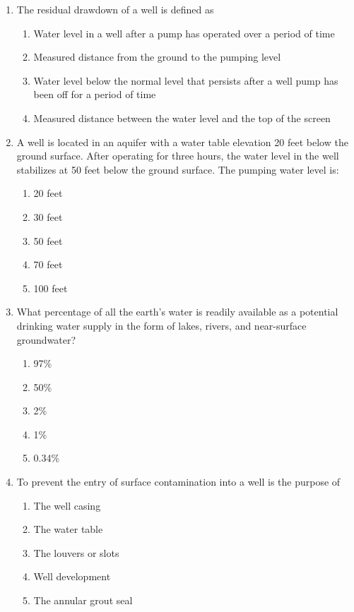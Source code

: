 \documentclass{article}
\begin{document}
\begin{enumerate}
\item The residual drawdown of a well is defined as
\begin{enumerate}
\item Water level in a well after a pump has operated over a period of time
\item Measured distance from the ground to the pumping level
\item Water level below the normal level that persists after a well pump has been off for a period of time
\item Measured distance between the water level and the top of the screen
\end{enumerate}

\item A well is located in an aquifer with a water table elevation 20 feet below the ground surface. After operating for three hours, the water level in the well stabilizes at 50 feet below the ground surface. The pumping water level is:
\begin{enumerate}
\item 20 feet
\item 30 feet
\item 50 feet
\item 70 feet
\item 100 feet
\end{enumerate}

\item What percentage of all the earth's water is readily available as a potential drinking water supply in the form of lakes, rivers, and near-surface groundwater?
\begin{enumerate}
\item 97\%
\item 50\%
\item 2\%
\item 1\%
\item 0.34\%
\end{enumerate}

\item To  prevent the entry of surface contamination into a well is the purpose of
\begin{enumerate}
\item The well casing
\item The water table
\item The louvers or slots
\item Well development
\item The  annular grout seal	
\end{enumerate}


\end{enumerate}
\end{document}
